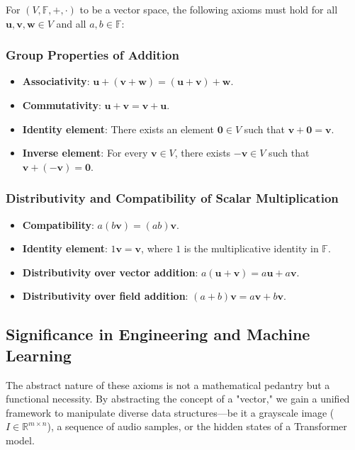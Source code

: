 \documentclass[12pt,a4paper,twoside,openright]{book}
\begin{document}
For $(V, \mathbb{F}, +, \cdot)$ to be a vector space, the following axioms must hold for all $\mathbf{u}, \mathbf{v}, \mathbf{w} \in V$ and all $a, b \in \mathbb{F}$:

\subsubsection*{Group Properties of Addition}
\begin{itemize}
    \item \textbf{Associativity}: $\mathbf{u} + (\mathbf{v} + \mathbf{w}) = (\mathbf{u} + \mathbf{v}) + \mathbf{w}$.
    \item \textbf{Commutativity}: $\mathbf{u} + \mathbf{v} = \mathbf{v} + \mathbf{u}$.
    \item \textbf{Identity element}: There exists an element $\mathbf{0} \in V$ such that $\mathbf{v} + \mathbf{0} = \mathbf{v}$.
    \item \textbf{Inverse element}: For every $\mathbf{v} \in V$, there exists $-\mathbf{v} \in V$ such that $\mathbf{v} + (-\mathbf{v}) = \mathbf{0}$.
\end{itemize}

\subsubsection*{Distributivity and Compatibility of Scalar Multiplication}
\begin{itemize}
    \item \textbf{Compatibility}: $a(b\mathbf{v}) = (ab)\mathbf{v}$.
    \item \textbf{Identity element}: $1\mathbf{v} = \mathbf{v}$, where $1$ is the multiplicative identity in $\mathbb{F}$.
    \item \textbf{Distributivity over vector addition}: $a(\mathbf{u} + \mathbf{v}) = a\mathbf{u} + a\mathbf{v}$.
    \item \textbf{Distributivity over field addition}: $(a + b)\mathbf{v} = a\mathbf{v} + b\mathbf{v}$.
\end{itemize}

\subsection{Significance in Engineering and Machine Learning}

The abstract nature of these axioms is not a mathematical pedantry but a functional necessity. By abstracting the concept of a "vector," we gain a unified framework to manipulate diverse data structures—be it a grayscale image ($I \in \mathbb{R}^{m \times n}$), a sequence of audio samples, or the hidden states of a Transformer model. 
\end{document}
